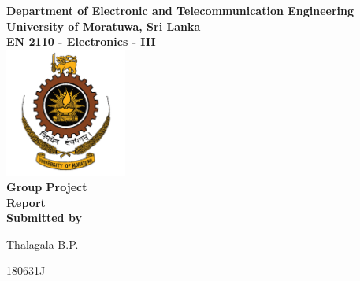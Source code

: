 \begin{titlepage}
\center %

\textbf{\large Department of Electronic and Telecommunication Engineering}\\[0.5cm]
\textbf{\Large University of Moratuwa, Sri Lanka}\\[1cm]
\textbf{\large EN 2110 - Electronics - III}\\[2cm]
\includegraphics[width=0.3\textwidth]{figures/uomlogo}\\[2cm]

	
\textbf{\Huge Group Project}\\[0.5cm]
\textbf{\Large Report}\\[5cm]



\textbf{\large Submitted by}\\[0.5cm]
\begin{minipage}{0.2\textwidth}
	\begin{flushleft}
		{\large Thalagala B.P.}\\[4mm]
		
		
		
	\end{flushleft}
\end{minipage}
\hspace{5mm}
\begin{minipage}{0.2\textwidth}
	\begin{flushright}
		{\large 180631J }\\[4mm]
		

\end{flushright}
\end{minipage}
\end{titlepage}

